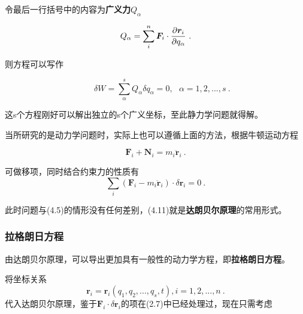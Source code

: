 \documentclass[a4paper,c5size,twoside,UTF8]{ctexart} %
\numberwithin{equation}{section}   %
\begin{document}
令最后一行括号中的内容为\textbf{广义力$Q_\alpha$}

\begin{equation}
    Q_\alpha=\sum_i^n\boldsymbol{F}_i\cdot \pdv{\boldsymbol{r}_i}{q_\alpha}~.
\end{equation}

则方程可以写作

\begin{equation}
    ~~~~~~~\delta W =\sum_\alpha^s Q_\alpha \delta q_\alpha =0, ~~~\alpha=1,2,...,s ~.
\end{equation}

这s个方程刚好可以解出独立的s个广义坐标，至此静力学问题就得解。

当所研究的是动力学问题时，实际上也可以遵循上面的方法，根据牛顿运动方程

\begin{equation}
    \boldsymbol{F}_i+\boldsymbol{N}_i = m_i \ddot{\boldsymbol{r}}_i~.
\end{equation}

可做移项，同时结合约束力的性质有
\begin{equation}
    \sum_i(\boldsymbol{F}_i- m_i \ddot{\boldsymbol{r}}_i)\cdot \delta \boldsymbol{r}_i=0~.
\end{equation}

此时问题与(4.5)的情形没有任何差别，(4.11)就是\textbf{达朗贝尔原理}的常用形式。

\subsubsection{拉格朗日方程}

由达朗贝尔原理，可以导出更加具有一般性的动力学方程，即\textbf{拉格朗日方程}。

将坐标关系
\begin{equation}
      \boldsymbol{r}_i= \boldsymbol{r}_i(q_1,q_2,...,q_s,t), i=1,2,...,n~.
\end{equation}
代入达朗贝尔原理，鉴于$\boldsymbol{F}_i\cdot\delta \boldsymbol{r}_i$的项在(2.7)中已经处理过，现在只需考虑
\end{document}
